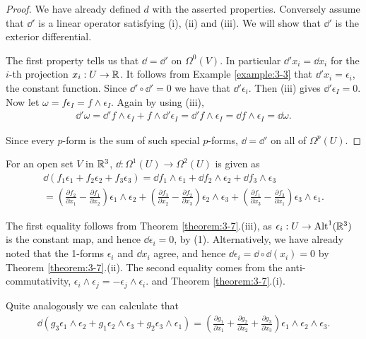 \begin{proof}
We have already defined $d$ with the asserted properties. Conversely assume
that $\dd'$ is a linear operator satisfying (i), (ii) and (iii). We will show that $\dd'$ is
the exterior differential.

The first property tells us that $\dd = \dd'$ on $\Omega^0(V)$. In particular $\dd' x_i = \dd x_i$ for the
$i$-th projection $x_i:U\to\mathbb{R}$. It follows from Example \ref{example:3-3} that $\dd' x_i = \epsilon_i$, 
the constant function. Since $\dd'\circ\dd' = 0$ we have that $\dd'\epsilon_i$. Then (iii) gives $\dd'\epsilon_I = 0$. 
Now let $\omega = f\epsilon_I = f\wedge\epsilon_I$. Again by using (iii),
\begin{align*}
  \dd'\omega = \dd'f\wedge\epsilon_I + f\wedge \dd'\epsilon_I
  = \dd'f\wedge\epsilon_I
  = \dd f\wedge\epsilon_I
  = \dd\omega.  
\end{align*}

Since every $p$-form is the sum of such special $p$-forms, $\dd = \dd'$ on all of $\Omega^p(U)$.
\end{proof}

For an open set $V$ in $\mathbb{R}^3$, $\dd:\Omega^1(U)\to\Omega^2(U)$ is given as 
\begin{align*}
  \dd(f_1\epsilon_1+f_2\epsilon_2+f_3\epsilon_3)
  = \dd f_1\wedge\epsilon_1+\dd f_2\wedge\epsilon_2+\dd f_3\wedge\epsilon_3 \\
  = \left(\frac{\partial f_{2}}{\partial x_{1}} - \frac{\partial f_{1}}{\partial x_{2}}\right)\epsilon_{1}\wedge\epsilon_{2}
    + \left(\frac{\partial f_{3}}{\partial x_{2}} - \frac{\partial f_{2}}{\partial x_{3}}\right)\epsilon_{2}\wedge\epsilon_{3}
    + \left(\frac{\partial f_{1}}{\partial x_{3}} - \frac{\partial f_{3}}{\partial x_{1}}\right)\epsilon_{3}\wedge\epsilon_{1}.
\end{align*}

The first equality follows from Theorem \ref{theorem:3-7}.(iii), as $\epsilon_i:U\to\operatorname{Alt}^1(\mathbb{R}^3)$ is the
constant map, and hence $\dd\epsilon_i=0$, by (1). Alternatively, we have already noted
that the 1-forms $\epsilon_i$ and $\dd x_i$ agree, and hence $\dd\epsilon_i = \dd\circ\dd(x_i) = 0$ 
by Theorem \ref{theorem:3-7}.(ii). The second equality comes from the anti-commutativity, $\epsilon_i\wedge\epsilon_j = -\epsilon_j\wedge\epsilon_i$.
and Theorem \ref{theorem:3-7}.(i).

Quite analogously we can calculate that
\begin{align*}
  \dd(g_3\epsilon_1\wedge\epsilon_2+g_1\epsilon_2\wedge\epsilon_3+g_2\epsilon_3\wedge\epsilon_1)
  = \left(\frac{\partial g_1}{\partial x_1}+\frac{\partial g_2}{\partial x_2}+\frac{\partial g_3}{\partial x_3}\right)
    \epsilon_1\wedge\epsilon_2\wedge\epsilon_3.
\end{align*}

